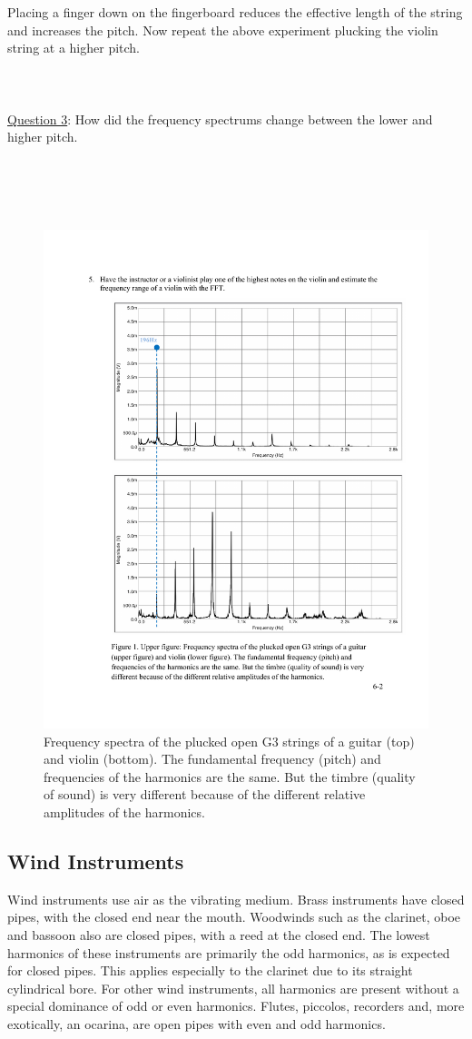 \documentclass[11pt]{NSF}
\begin{document}
Placing a finger down on the fingerboard reduces the effective length of the string and increases
the pitch. Now repeat the above experiment plucking the violin string at a higher pitch. 
\\
\\
\\
\\

\underline{Question 3}: 
How did the frequency spectrums change between the lower and higher pitch.
\\
\\
\\
\\
\\
%
\begin{figure}[hbtp]
\begin{center}
\includegraphics[width=.6\textwidth]{fig6_1}
\caption{Frequency spectra of the plucked open G3 strings of a guitar
(top) and violin (bottom). The fundamental frequency
(pitch) and frequencies of the harmonics are the same. But the timbre
(quality of sound) is very different because of the different relative
amplitudes of the harmonics.}
\label{f:1}
\end{center}
\end{figure}


\subsection{Wind Instruments} 
Wind instruments use air as the vibrating medium. Brass instruments
have closed pipes, with the closed end near the mouth. Woodwinds such
as the clarinet, oboe and bassoon also are closed pipes, with a reed
at the closed end. The lowest harmonics of these instruments are
primarily the odd harmonics, as is expected for closed pipes. This
applies especially to the clarinet due to its straight cylindrical
bore. For other wind instruments, all harmonics are present without a
special dominance of odd or even harmonics. Flutes, piccolos,
recorders and, more exotically, an ocarina, are open pipes with even
and odd harmonics.  \\
\end{document}

